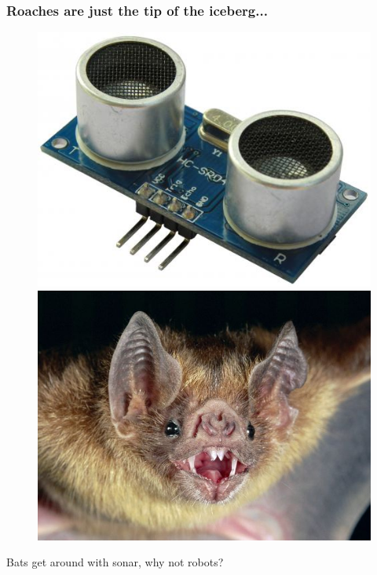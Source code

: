\documentclass[compress]{beamer}
\begin{document}
\begin{frame}
  \frametitle{Roaches are just the tip of the iceberg...}
  \begin{figure}
    \includegraphics[width=0.35\linewidth]{sonar.jpg}
    \quad
    \includegraphics[width=0.35\linewidth]{bat.jpg}
  \end{figure}     
  Bats get around with sonar, why not robots?
\end{frame}
\end{document}
